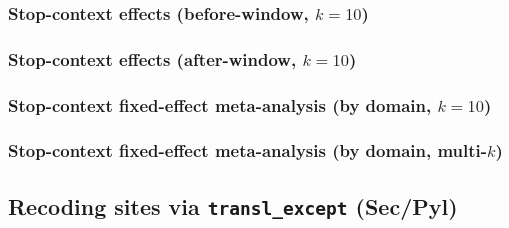 \subsubsection{Stop-context effects (before-window, \texorpdfstring{$k=10$}{k=10})}
\begin{center}
\scriptsize
\setlength{\tabcolsep}{3pt}
\renewcommand{\arraystretch}{1.10}
\end{center}

\subsubsection{Stop-context effects (after-window, \texorpdfstring{$k=10$}{k=10})}
\begin{center}
\scriptsize
\setlength{\tabcolsep}{3pt}
\renewcommand{\arraystretch}{1.10}
\end{center}

\subsubsection{Stop-context fixed-effect meta-analysis (by domain, \texorpdfstring{$k=10$}{k=10})}
\noindent

\subsubsection{Stop-context fixed-effect meta-analysis (by domain, multi-\texorpdfstring{$k$}{k})}
\noindent

\subsection{Recoding sites via \texttt{transl\_except} (Sec/Pyl)}
\label{app:recoding_sites}

